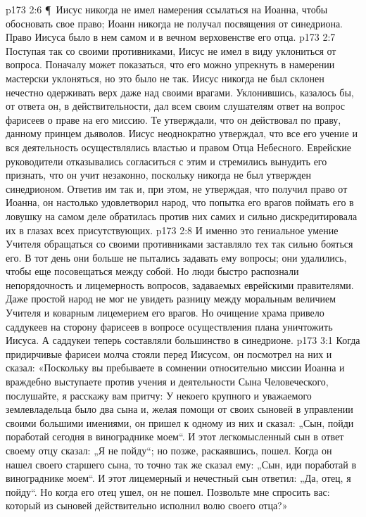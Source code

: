 \vs p173 2:6 \P\ Иисус никогда не имел намерения ссылаться на Иоанна, чтобы обосновать свое право; Иоанн никогда не получал посвящения от синедриона. Право Иисуса было в нем самом и в вечном верховенстве его отца.
\vs p173 2:7 Поступая так со своими противниками, Иисус не имел в виду уклониться от вопроса. Поначалу может показаться, что его можно упрекнуть в намерении мастерски уклоняться, но это было не так. Иисус никогда не был склонен нечестно одерживать верх даже над своими врагами. Уклонившись, казалось бы, от ответа он, в действительности, дал всем своим слушателям ответ на вопрос фарисеев о праве на его миссию. Те утверждали, что он действовал по праву, данному принцем дьяволов. Иисус неоднократно утверждал, что все его учение и вся деятельность осуществлялись властью и правом Отца Небесного. Еврейские руководители отказывались согласиться с этим и стремились вынудить его признать, что он учит незаконно, поскольку никогда не был утвержден синедрионом. Ответив им так и, при этом, не утверждая, что получил право от Иоанна, он настолько удовлетворил народ, что попытка его врагов поймать его в ловушку на самом деле обратилась против них самих и сильно дискредитировала их в глазах всех присутствующих.
\vs p173 2:8 И именно это гениальное умение Учителя обращаться со своими противниками заставляло тех так сильно бояться его. В тот день они больше не пытались задавать ему вопросы; они удалились, чтобы еще посовещаться между собой. Но люди быстро распознали непорядочность и лицемерность вопросов, задаваемых еврейскими правителями. Даже простой народ не мог не увидеть разницу между моральным величием Учителя и коварным лицемерием его врагов. Но очищение храма привело саддукеев на сторону фарисеев в вопросе осуществления плана уничтожить Иисуса. А саддукеи теперь составляли большинство в синедрионе.
\vs p173 3:1 Когда придирчивые фарисеи молча стояли перед Иисусом, он посмотрел на них и сказал: «Поскольку вы пребываете в сомнении относительно миссии Иоанна и враждебно выступаете против учения и деятельности Сына Человеческого, послушайте, я расскажу вам притчу: У некоего крупного и уважаемого землевладельца было два сына и, желая помощи от своих сыновей в управлении своими большими имениями, он пришел к одному из них и сказал: „Сын, пойди поработай сегодня в винограднике моем“. И этот легкомысленный сын в ответ своему отцу сказал: „Я не пойду“; но позже, раскаявшись, пошел. Когда он нашел своего старшего сына, то точно так же сказал ему: „Сын, иди поработай в винограднике моем“. И этот лицемерный и нечестный сын ответил: „Да, отец, я пойду“. Но когда его отец ушел, он не пошел. Позвольте мне спросить вас: который из сыновей действительно исполнил волю своего отца?»
